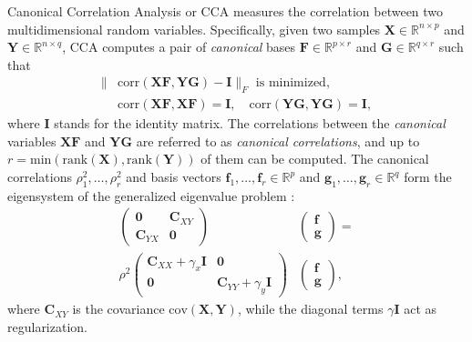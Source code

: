 \documentclass{article}
\begin{document}
  Canonical Correlation Analysis or CCA \citep{Hotelling36} measures the
  correlation between two multidimensional random variables.  Specifically,
  given two samples $\bm X \in \mathbb{R}^{n\times p}$ and $\bm Y \in
  \mathbb{R}^{n\times q}$, CCA computes a pair of \emph{canonical} bases $\bm F \in
  \mathbb{R}^{p \times r}$ and $\bm G \in \mathbb{R}^{q \times r}$ such that 
  \begin{align*}
    \|&\mathrm{corr}(\bm X\bm F,\bm Y\bm G)-\bm I\|_F \text{ is minimized},\\
      &\mathrm{corr}(  \bm X\bm F,\bm X\bm F) = \bm I,\quad \mathrm{corr}(  \bm
      Y\bm G,\bm Y\bm G) = \bm I,
  \end{align*}
  where $\bm I$ stands for the identity matrix. The correlations between the
  \emph{canonical} variables $\bm X\bm F$ and $\bm Y\bm G$ are referred to as
  \emph{canonical correlations}, and up to $r =\text{min}(\text{rank}(\bm X),
  \text{rank}(\bm Y))$ of them can be computed.  The canonical correlations
  $\rho^2_1, \ldots, \rho^2_r$ and basis vectors $\bm f_1,\ldots, \bm f_r \in
  \mathbb{R}^p$ and $\bm g_1, \ldots, \bm g_r \in \mathbb{R}^q$ form the
  eigensystem of the generalized eigenvalue problem \citep{Bie05}:
  \begin{align*}
    \left(
        \begin{array}{cc}
         \bm 0 &  \bm C_{XY}\\
         \bm C_{YX} & \bm 0
        \end{array}
        \right)
    &\left(
        \begin{array}{c}
         \bm f\\
         \bm g 
        \end{array}
        \right)
    =\\
    \rho^2
    \left(
        \begin{array}{cc}
         \bm C_{XX} + \gamma_x \bm I & \bm 0\\
         \bm 0 & \bm C_{YY} + \gamma_y \bm I
        \end{array}
        \right)
    &\left(
        \begin{array}{c}
         \bm f\\
         \bm g 
        \end{array}
        \right)
    ,\nonumber
  \end{align*}
  where $ \bm C_{XY}$ is the covariance $\text{cov}(\bm X, \bm Y)$, while the
  diagonal terms $\gamma \bm I$ act as regularization.
\end{document}
